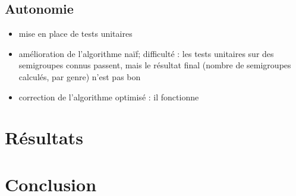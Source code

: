 \documentclass[12pt,a4paper]{article}
\begin{document}
\subsection{Autonomie}

\begin{itemize}
	\item	mise en place de tests unitaires
	\item	amélioration de l'algorithme naïf; difficulté : les tests unitaires sur des semigroupes connus passent, mais le résultat final (nombre de semigroupes calculés, par genre) n'est pas bon
	\item	correction de l'algorithme optimisé : il fonctionne
\end{itemize}

\section{Résultats}

\section*{Conclusion}
\end{document}
